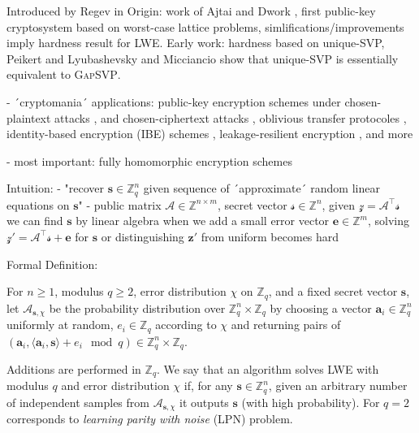 \documentclass[
  a4paper,  %
  twoside,  %
  bibliography=totoc,
  headsepline,
  cleardoublepage=empty,
  parskip=half,
  draft=false
]{scrbook}
\begin{document}
Introduced by Regev in \cite{Reg09}
Origin: work of Ajtai and Dwork \cite{AD97}, first public-key cryptosystem based on worst-case lattice problems, simlifications/improvements \cite{GGH97b, Reg03} imply hardness result for LWE.
Early work: hardness based on unique-SVP, Peikert \cite{Pei09} and Lyubashevsky and Micciancio \cite{LM09} show that unique-SVP is essentially equivalent to \textsc{GapSVP}.

- ´cryptomania´ applications: public-key encryption schemes under chosen-plaintext attacks \cite{Reg05, KTX07, PVW08}, and chosen-ciphertext attacks \cite{PW08, Pei09}, oblivious transfer protocoles \cite{PVW08}, identity-based encryption (IBE) schemes \cite{GPV08, CHKP10, ABB10}, leakage-resilient encryption \cite{AGV09, ACPS09, DGKPV10, GKPV10}, and more %

- most important: fully homomorphic encryption schemes \cite{Gen09a, BV11, Bra12, GSW13} %

Intuition:
- "recover $\mathbf{s} \in \mathbb{Z}_q^n$ given sequence of ´approximate´ random linear equations on $\mathbf{s}$"
- public matrix  $\mathcal{A} \in \mathbb{Z}^{n \times m}$, secret vector $\mathcal{s}\in \mathbb{Z}^n$, given $\mathcal{z} = \mathcal{A}^\intercal \mathcal{s}$ we can find $\mathbf{s}$ by linear algebra
when we add a small error vector $\mathbf{e} \in \mathbb{Z}^m$, solving $\mathcal{z}' = \mathcal{A}^\intercal \mathcal{s} + \mathbf{e}$ for $\mathbf{s}$ or distinguishing $\mathbf{z}'$ from uniform becomes hard


Formal Definition:
\begin{definition} %
  For $n \geq 1$, modulus $q \geq 2$, error distribution $\chi$ on $\mathbb{Z}_q$, and a fixed secret vector $\mathbf{s}$, let $\mathcal{A}_{\mathbf{s}, \chi}$ be the probability distribution over $\mathbb{Z}_q^n \times \mathbb{Z}_q$ by choosing a vector $\mathbf{a}_i \in \mathbb{Z}_q^n$ uniformly at random, $e_i \in \mathbb{Z}_q$ according to $\chi$ and returning pairs of $(\mathbf{a}_i, \langle \mathbf{a}_i, \mathbf{s} \rangle + e_i \mod q) \in \mathbb{Z}_q^n \times \mathbb{Z}_q$.
\end{definition}

Additions are performed in $\mathbb{Z}_q$. We say that an algorithm solves LWE with modulus $q$ and error distribution $\chi$ if, for any $\mathbf{s} \in \mathbb{Z}_q^n$, given an arbitrary number of independent samples from $\mathcal{A}_{\mathbf{s}, \chi}$ it outputs $\mathbf{s}$ (with high probability). For $q=2$ corresponds to \textit{learning parity with noise} (LPN) problem. %
\end{document}

